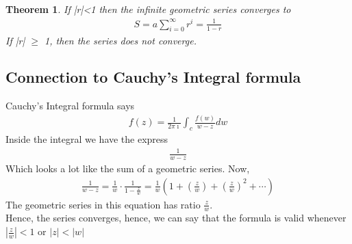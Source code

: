 \documentclass[12pt]{report}
\newcommand{\dsp}{\displaystyle}
\newcommand{\NI}{\noindent}
\newcommand{\imaginary}{\imath}
\newtheorem{theorem}{Theorem}[chapter]
\begin{document}
	\begin{theorem}
		If |r|<1 then the infinite geometric series converges to 
		\begin{eqnarray*}
			S = a\sum_{i=0}^{\infty}r^i = \frac{1}{1-r}
		\end{eqnarray*}
		If |r| $\geq$ 1, then the series does not converge.
	\end{theorem}
	
	\subsection{Connection to Cauchy's Integral formula}
	Cauchy's Integral formula says
	\begin{eqnarray*}
		f(z) = \frac{1}{2\pi\imaginary}\int_c \frac{f(w)}{w-z}dw
	\end{eqnarray*}
	Inside the integral we have the express
	\begin{eqnarray*}
		\frac{1}{w-z}
	\end{eqnarray*}
	Which looks a lot like the sum of a geometric series. Now,
	\begin{eqnarray*}
		\frac{1}{w-z} = \frac{1}{w}\cdot \frac{1}{1-\frac{z}{w}} = \frac{1}{w}\left( 1 + \left(\frac{z}{w}\right)+ \left(\frac{z}{w}\right)^2 + \cdots \right)
	\end{eqnarray*}
	The geometric series in this equation has ratio $\dsp\frac{z}{w}$.\\
	
	\NI Hence, the series converges, hence, we can say that the formula is valid whenever $\dsp\left|\frac{z}{w}\right| < 1$ or $|z|< |w|$



	
\end{document}
